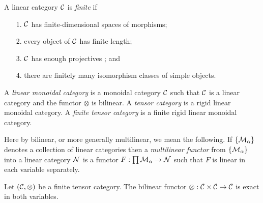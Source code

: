 \documentclass{amsart}
\begin{document}
\begin{definition} %
	A linear category $\mathcal C$ is {\em finite} if 
	\begin{enumerate}
		\item[1.] $\mathcal C$ has finite-dimensional spaces of morphisms;
		\item[2.] every object of $\mathcal C$ has finite length;
		\item[3.] $\mathcal C$ has enough projectives%
		; and
		\item[4.] there are finitely many isomorphism classes of simple objects.  
	\end{enumerate}
\end{definition}

\begin{definition}
	A {\em linear monoidal category} is a monoidal category $\mathcal C$ such that $\mathcal C$ is a linear category and the functor $\otimes$ is bilinear.  A {\em tensor category} is a rigid linear monoidal category.  A {\em finite tensor category} is a finite rigid linear monoidal category.
\end{definition}

\nid Here by bilinear, or more generally multilinear, we mean the following.  If $\{\mathcal M_\alpha\}$ denotes a collection of linear categories then a {\em multilinear functor} from $\{\mathcal M_\alpha\}$ into a linear category $\mathcal N$ is a functor $F: \prod \mathcal M_\alpha \to \mathcal N$ such that $F$ is linear in each variable separately. 

\begin{lemma} \cite[2.1.8]{MR1797619} \cite[Prop. 1.13.1]{EGNO}  \label{lma:RigidIsExact}
	Let $(\mathcal C, \otimes)$ be a finite tensor category. The bilinear functor $\otimes: \mathcal C \times \mathcal C \to \mathcal C$ is exact in both variables. 
\end{lemma}
\end{document}

